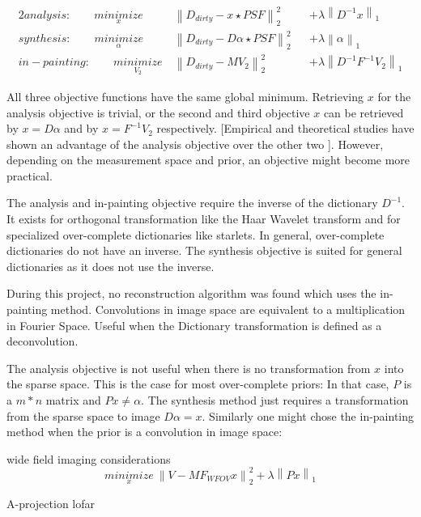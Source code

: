 \begin{alignat*}{2}
	analysis:\qquad \underset{x}{minimize} \:& \left \| D_{dirty} - x \star PSF \right \|_2^2 &&+  \lambda \left \| D^{-1}x \right \|_1 \\
	synthesis:\qquad \underset{\alpha}{minimize} \:& \left \| D_{dirty} - D \alpha \star PSF \right \|_2^2 &&+ \lambda \left \| \alpha \right \|_1 \\
	in-painting:\qquad \underset{V_2}{minimize} \:& \left \|  D_{dirty} - M V_2 \right \|_2^2 &&+ \lambda \left \| D^{-1}F^{-1}V_2\right \|_1
\end{alignat*}

All three objective functions have the same global minimum. Retrieving $x$ for the analysis objective is trivial, or the second and third objective $x$ can be retrieved by $x = D\alpha$ and by $x = F^{-1}V_2$ respectively. [Empirical and theoretical studies have shown an advantage of the analysis objective over the other two \cite{something}]. However, depending on the measurement space and prior, an objective might become more practical.

The analysis and in-painting objective require the inverse of the dictionary $D^{-1}$. It exists for orthogonal transformation like the Haar Wavelet transform and for specialized over-complete dictionaries like starlets. In general, over-complete dictionaries do not have an inverse. The synthesis objective is suited for general dictionaries as it does not use the inverse.

During this project, no reconstruction algorithm was found which uses the in-painting method. 
Convolutions in image space are equivalent to a multiplication in Fourier Space.
Useful when the Dictionary transformation is defined as a deconvolution.

The analysis objective is not useful when there is no transformation from $x$ into the sparse space. This is the case for most over-complete priors: In that case, $P$ is a $m*n$ matrix and  $Px \ne \alpha$. The synthesis method just requires a transformation from the sparse space to image $D\alpha = x$. Similarly one might chose the in-painting method when the prior is a convolution in image space: 

wide field imaging considerations
\begin{equation}\label{cs:eq:wfield}
	\underset{x}{minimize} \: \left \| V - MF_{WFOV} x \right \|_2^2 + \lambda \left \| Px\right \|_1
\end{equation}

A-projection lofar \cite{tasse2013applying}



